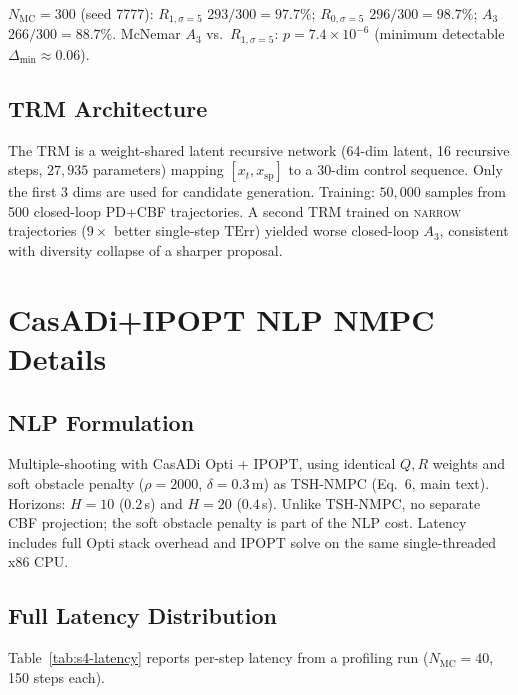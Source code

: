 \documentclass[11pt,a4paper]{article}
\newcommand{\Nm}{N_{\mathrm{MC}}}
\newcommand{\spt}{\mathrm{sp}}
\newcommand{\TErr}{\mathrm{TErr}}
\begin{document}
$\Nm = 300$ (seed 7777): $R_{1,\sigma=5}$ $293/300 = 97.7\%$;
$R_{0,\sigma=5}$ $296/300 = 98.7\%$; $A_3$ $266/300 = 88.7\%$.
McNemar $A_3$ vs.\ $R_{1,\sigma=5}$: $p = 7.4 \times 10^{-6}$
(minimum detectable $\Delta_{\min} \approx 0.06$).

\subsection{TRM Architecture}

The TRM is a weight-shared latent recursive network (64-dim latent,
16 recursive steps, $27{,}935$ parameters) mapping $[x_t, x_\spt]$ to
a 30-dim control sequence. Only the first 3 dims are used for
candidate generation. Training: $50{,}000$ samples from 500
closed-loop PD+CBF trajectories. A second TRM trained on
\textsc{narrow} trajectories ($9\times$ better single-step $\TErr$)
yielded worse closed-loop $A_3$, consistent with diversity collapse
of a sharper proposal.

\section{CasADi+IPOPT NLP NMPC Details}
\label{sec:S4}

\subsection{NLP Formulation}

Multiple-shooting with CasADi Opti + IPOPT, using identical $Q, R$
weights and soft obstacle penalty ($\rho = 2000$, $\delta = 0.3$\,m)
as TSH-NMPC (Eq.~6, main text). Horizons: $H = 10$ ($0.2$\,s) and
$H = 20$ ($0.4$\,s). Unlike TSH-NMPC, no separate CBF projection;
the soft obstacle penalty is part of the NLP cost. Latency includes
full Opti stack overhead and IPOPT solve on the same single-threaded
x86 CPU.

\subsection{Full Latency Distribution}

Table~\ref{tab:s4-latency} reports per-step latency from a profiling
run ($\Nm = 40$, 150 steps each).
\end{document}
